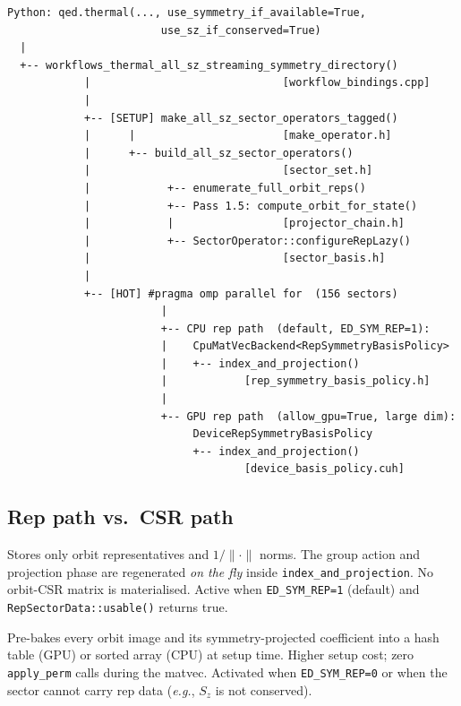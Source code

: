 \documentclass[11pt,a4paper]{article}
\begin{document}
\begin{lstlisting}[style=pseudo, caption={Top-level call chain from Python to C++/CUDA kernel}]
Python: qed.thermal(..., use_symmetry_if_available=True,
                        use_sz_if_conserved=True)
  |
  +-- workflows_thermal_all_sz_streaming_symmetry_directory()
            |                              [workflow_bindings.cpp]
            |
            +-- [SETUP] make_all_sz_sector_operators_tagged()
            |      |                       [make_operator.h]
            |      +-- build_all_sz_sector_operators()
            |                              [sector_set.h]
            |            +-- enumerate_full_orbit_reps()
            |            +-- Pass 1.5: compute_orbit_for_state()
            |            |                 [projector_chain.h]
            |            +-- SectorOperator::configureRepLazy()
            |                              [sector_basis.h]
            |
            +-- [HOT] #pragma omp parallel for  (156 sectors)
                        |
                        +-- CPU rep path  (default, ED_SYM_REP=1):
                        |    CpuMatVecBackend<RepSymmetryBasisPolicy>
                        |    +-- index_and_projection()
                        |            [rep_symmetry_basis_policy.h]
                        |
                        +-- GPU rep path  (allow_gpu=True, large dim):
                             DeviceRepSymmetryBasisPolicy
                             +-- index_and_projection()
                                     [device_basis_policy.cuh]
\end{lstlisting}

\subsection{Rep path vs.\ CSR path}

\begin{description}[leftmargin=2.5cm, labelwidth=2.3cm]
  \item[\textbf{Rep path}] Stores only orbit representatives and
    $1/\|\cdot\|$ norms.  The group action and projection phase are
    regenerated \emph{on the fly} inside \texttt{index\_and\_projection}.
    No orbit-CSR matrix is materialised.  Active when
    \texttt{ED\_SYM\_REP=1} (default) and \texttt{RepSectorData::usable()}
    returns true.

  \item[\textbf{CSR path}] Pre-bakes every orbit image and its
    symmetry-projected coefficient into a hash table (GPU) or sorted array
    (CPU) at setup time.  Higher setup cost; zero \texttt{apply\_perm} calls
    during the matvec.  Activated when \texttt{ED\_SYM\_REP=0} or when the
    sector cannot carry rep data (\emph{e.g.}, $S_z$ is not conserved).
\end{description}
\end{document}
